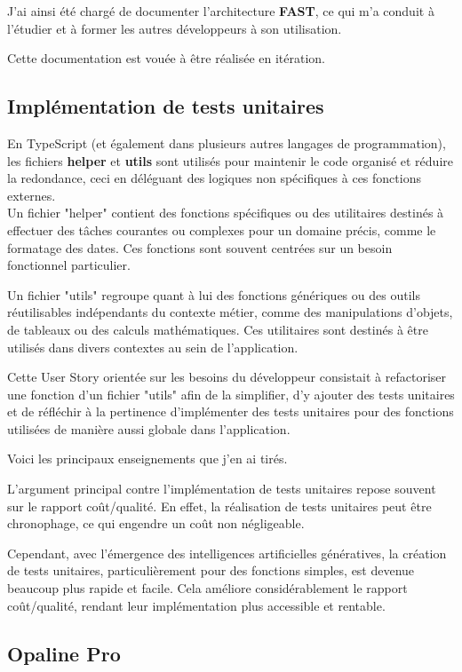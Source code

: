 \documentclass{article}
\begin{document}
J'ai ainsi été chargé de documenter l'architecture \textbf{FAST}, ce qui m'a conduit à l'étudier et à former les autres développeurs à son utilisation.

Cette documentation est vouée à être réalisée en itération.

\subsection{Implémentation de tests unitaires}

En TypeScript (et également dans plusieurs autres langages de programmation), les fichiers \textbf{helper} et \textbf{utils} sont utilisés pour maintenir le code organisé et réduire la redondance, ceci en déléguant des logiques non spécifiques à ces fonctions externes. \\

Un fichier "helper" contient des fonctions spécifiques ou des utilitaires destinés à effectuer des tâches courantes ou complexes pour un domaine précis, comme le formatage des dates. Ces fonctions sont souvent centrées sur un besoin fonctionnel particulier.

Un fichier "utils" regroupe quant à lui des fonctions génériques ou des outils réutilisables indépendants du contexte métier, comme des manipulations d'objets, de tableaux ou des calculs mathématiques. Ces utilitaires sont destinés à être utilisés dans divers contextes au sein de l'application.

Cette User Story orientée sur les besoins du développeur consistait à refactoriser une fonction d'un fichier "utils" afin de la simplifier, d'y ajouter des tests unitaires et de réfléchir à la pertinence d'implémenter des tests unitaires pour des fonctions utilisées de manière aussi globale dans l'application.

Voici les principaux enseignements que j'en ai tirés.

L'argument principal contre l'implémentation de tests unitaires repose souvent sur le rapport coût/qualité. En effet, la réalisation de tests unitaires peut être chronophage, ce qui engendre un coût non négligeable.

Cependant, avec l'émergence des intelligences artificielles génératives, la création de tests unitaires, particulièrement pour des fonctions simples, est devenue beaucoup plus rapide et facile. Cela améliore considérablement le rapport coût/qualité, rendant leur implémentation plus accessible et rentable.

\subsection{Opaline Pro}
\end{document}

